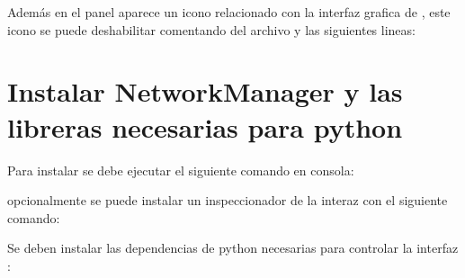 \documentclass[letterpaper,10pt,english]{sphinxhowto}
\begin{document}
\begin{sphinxVerbatim}[commandchars=\\\{\}]
   
\end{sphinxVerbatim}

Además en el panel aparece un icono relacionado con la interfaz grafica de , este icono se puede
deshabilitar comentando del archivo  y las siguientes lineas:

\begin{sphinxVerbatim}[commandchars=\\\{\}]
\end{sphinxVerbatim}


\section{Instalar NetworkManager y las libreras necesarias para python}
\label{\detokenize{index:instalar-networkmanager-y-las-libreras-necesarias-para-python}}
Para instalar  se debe ejecutar el siguiente comando en consola:

\begin{sphinxVerbatim}[commandchars=\\\{\}]
   
\end{sphinxVerbatim}

opcionalmente se puede instalar un inspeccionador de la interaz 
con el siguiente comando:

\begin{sphinxVerbatim}[commandchars=\\\{\}]
   
\end{sphinxVerbatim}

Se deben instalar las dependencias de python necesarias para controlar la interfaz :

\begin{sphinxVerbatim}[commandchars=\\\{\}]
     
\end{sphinxVerbatim}
\end{document}
